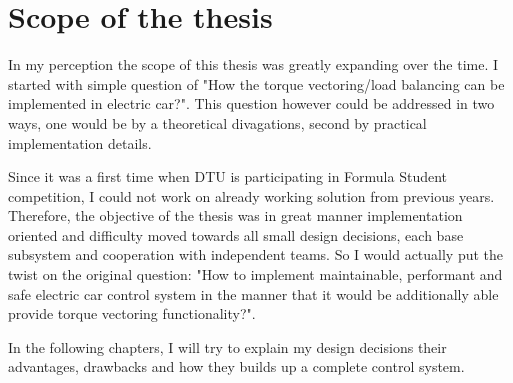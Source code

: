 






\section{Scope of the thesis}
In my perception the scope of this thesis was greatly expanding over the time. I started with simple question of "How the torque vectoring/load balancing can be implemented in electric car?". This question however could be addressed in two ways, one would be by a theoretical divagations, second by practical implementation details.

Since it was a first time when DTU is participating in Formula Student competition, I could not work on already working solution from previous years.
Therefore, the objective of the thesis was in great manner implementation oriented and difficulty moved towards all small design decisions, each base subsystem and cooperation with independent teams. So I would actually put the twist on the original question: "How to implement maintainable, performant and safe electric car control system in the manner that it would be additionally able provide torque vectoring functionality?".

In the following chapters, I will try to explain my design decisions their advantages, drawbacks and how they builds up a complete control system.